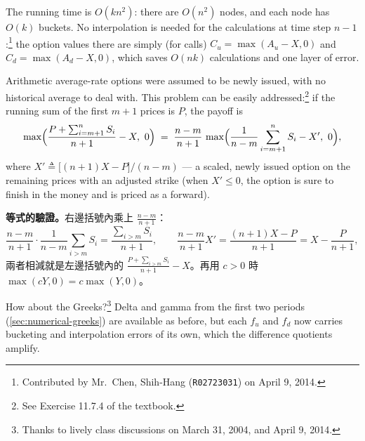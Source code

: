 The running time is $O(kn^{2})$: there are $O(n^{2})$ nodes, and each node has $O(k)$ buckets.
No interpolation is needed for the calculations at time step $n-1$:\footnote{Contributed by Mr.~Chen, Shih-Hang (\texttt{R02723031}) on April 9, 2014.} the option values there are simply (for calls) $C_{u}=\max(A_{u}-X,0)$ and $C_{d}=\max(A_{d}-X,0)$, which saves $O(nk)$ calculations and one layer of error.

\suppstart
{}
\suppend

Arithmetic average-rate options were assumed to be newly issued, with no historical average to deal with.
This problem can be easily addressed:\footnote{See Exercise 11.7.4 of the textbook.} if the running sum of the first $m+1$ prices is $P$, the payoff is
\suppstart
\[
	\max\Bigl(\frac{P+\sum_{i=m+1}^{n}S_{i}}{n+1}-X,\ 0\Bigr)
	\;=\; \frac{n-m}{n+1}\,\max\Bigl(\frac{1}{n-m}\sum_{i=m+1}^{n}S_{i}-X',\ 0\Bigr) ,
\]
where $X'\triangleq\bigl[(n+1)X-P\bigr]/(n-m)$ ---
a scaled, newly issued option on the remaining prices with an adjusted strike (when $X'\le0$, the option is sure to finish in the money and is priced as a forward).


\begin{remark}
	\textbf{等式的驗證。}右邊括號內乘上 $\frac{n-m}{n+1}$：
	\[
		\frac{n-m}{n+1}\cdot\frac{1}{n-m}\sum_{i>m}S_{i}=\frac{\sum_{i>m}S_{i}}{n+1} ,
		\qquad
		\frac{n-m}{n+1}X'=\frac{(n+1)X-P}{n+1}=X-\frac{P}{n+1} ,
	\]兩者相減就是左邊括號內的 $\frac{P+\sum_{i>m}S_{i}}{n+1}-X$。再用 $c>0$ 時 $\max(cY,0)=c\max(Y,0)$。
\end{remark}
\suppend
How about the Greeks?\footnote{Thanks to lively class discussions on March 31, 2004, and April 9, 2014.}
\suppstart
Delta and gamma from the first two periods (\autoref{sec:numerical-greeks}) are available as before, but each $f_{u}$ and $f_{d}$ now carries bucketing and interpolation errors of its own, which the difference quotients amplify.

\suppend


